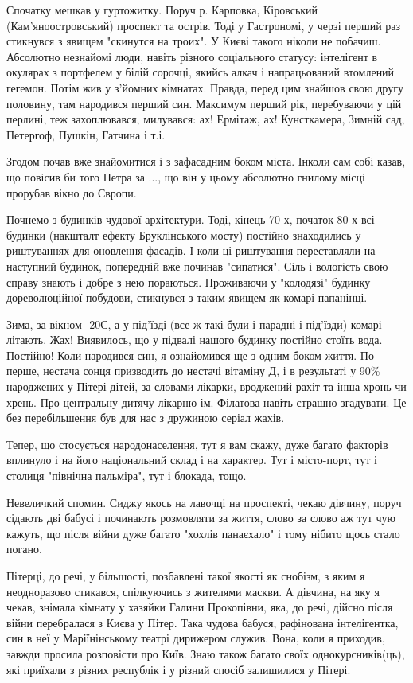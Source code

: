 \begin{itemize}
Спочатку мешкав у гуртожитку. Поруч р. Карповка, Кіровський
(Кам'яноостровський) проспект та острів. Тоді у Гастрономі, у черзі перший раз
стикнувся з явищем "скинутся на троих". У Києві такого ніколи не побачиш.
Абсолютно незнайомі люди, навіть різного соціального статусу: інтелігент в
окулярах з портфелем у білій сорочці, якийсь алкач і напрацьований втомлений
гегемон. Потім жив у з'йомних кімнатах. Правда, перед цим знайшов свою другу
половину, там народився перший син. Максимум перший рік, перебуваючи у цій
перлині, теж захоплювався, милувався: ах! Ермітаж, ах! Кунсткамера, Зимній сад,
Петергоф, Пушкін, Гатчина і т.і. 

Згодом почав вже знайомитися і з зафасадним боком міста. Інколи сам собі казав,
що повісив би того Петра за ..., що він у цьому абсолютно гнилому місці
прорубав вікно до Європи. 

Почнемо з будинків чудової архітектури. Тоді, кінець 70-х, початок 80-х всі
будинки (накшталт ефекту Бруклінського мосту) постійно знаходились у
риштуваннях для оновлення фасадів. І коли ці риштування переставляли на
наступний будинок, попередній вже починав "сипатися". Сіль і вологість свою
справу знають і добре з нею пораються. Проживаючи у "колодязі" будинку
дореволюційної побудови, стикнувся з таким явищем як комарі-папанінці. 

Зима, за вікном -20С, а у під'їзді (все ж такі були і парадні і під'їзди)
комарі літають. Жах! Виявилось, що у підвалі нашого будинку постійно стоїть
вода. Постійно! Коли народився син, я ознайомився ще з одним боком життя. По
перше, нестача сонця призводить до нестачі вітаміну Д, і в результаті у 90\%
народжених у Пітері дітей, за словами лікарки, вроджений рахіт та інша хронь чи
хрень. Про центральну дитячу лікарню ім. Філатова навіть страшно згадувати. Це
без перебільшення був для нас з дружиною серіал жахів.

Тепер, що стосується народонаселення, тут я вам скажу, дуже багато факторів
вплинуло і на його національний склад і на характер. Тут і місто-порт, тут і
столиця "північна пальміра", тут і блокада, тощо. 

Невеличкий спомин. Сиджу
якось на лавочці на проспекті, чекаю дівчину, поруч сідають дві бабусі і
починають розмовляти за життя, слово за слово аж тут чую кажуть, що після війни
дуже багато "хохлів панаєхало" і тому нібито щось стало погано. 

Пітерці, до речі, у більшості, позбавлені такої якості як снобізм, з яким я
неодноразово стикався, спілкуючись з жителями маскви. А дівчина, на яку я
чекав, знімала кімнату у хазяйки Галини Прокопівни, яка, до речі, дійсно після
війни перебралася з Києва у Пітер. Така чудова бабуся, рафінована інтелігентка,
син в неї у Маріїнінському театрі дирижером служив. Вона, коли я приходив,
завжди просила розповісти про Київ. Знаю також багато своїх однокурсників(ць),
які приїхали з різних республік і у різний спосіб залишилися у Пітері.


\end{itemize}
